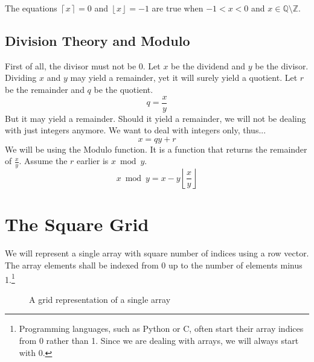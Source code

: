 \documentclass[twoside,openany,12pt]{book}
\begin{document}
    The equations $\left\lceil x \right\rceil = 0$ and $\left\lfloor x \right\rfloor = -1$ are true when $-1 < x < 0$ and $x \in \mathbb{Q} \setminus \mathbb{Z}$.
    
    \section{Division Theory and Modulo} \label{modulo}
    First of all, the divisor must not be $0$. Let $x$ be the dividend and $y$ be the divisor. Dividing $x$ and $y$ may yield a remainder, yet it will surely yield a quotient. Let $r$ be the remainder and $q$ be the quotient.
    \begin{equation}
      q = \frac{x}{y} 
    \end{equation}
But it may yield a remainder. Should it yield a remainder, we will not be dealing with just integers anymore. We want to deal with integers only, thus...
    \begin{equation}
      x = qy + r
    \end{equation}
We will be using the Modulo function. It is a function that returns the remainder of $\frac{x}{y}$. Assume the $r$ earlier is $x\bmod y$.
    \begin{equation}
      x\bmod y = x - y\left\lfloor \frac{x}{y} \right\rfloor
    \end{equation}
    \newpage

    \chapter{The Square Grid} \label{1_square_grid}
    We will represent a single array with square number of indices using a row vector. The array elements shall be indexed from 0 up to the number of elements minus 1.\footnote{Programming languages, such as Python or C, often start their array indices from 0 rather than 1. Since we are dealing with arrays, we will always start with 0.}
    \begin{figure}[h]
    \centering
    \caption{A grid representation of a single array} \label{1f1}
    \end{figure}
\end{document}
